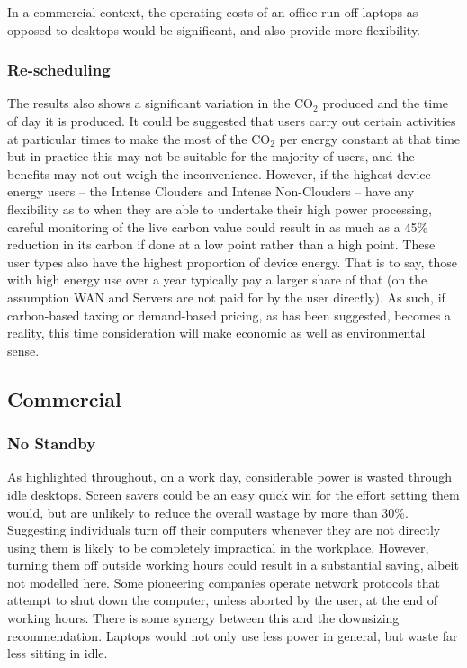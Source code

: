 \documentclass[conference]{IEEEtran}
\begin{document}

In a commercial context, the operating costs of an office run off
laptops as opposed to desktops would be significant, and also provide
more flexibility.

\subsubsection{Re-scheduling}

The results also shows a significant variation in the CO$_2$ produced
and the time of day it is produced. It could be suggested that users
carry out certain activities at particular times to make the most of
the CO$_2$ per energy constant at that time but in practice this may
not be suitable for the majority of users, and the benefits may not
out-weigh the inconvenience. However, if the highest device energy
users -- the Intense Clouders and Intense Non-Clouders -- have any
flexibility as to when they are able to undertake their high power
processing, careful monitoring of the live carbon value could result
in as much as a 45\% reduction in its carbon if done at a low point
rather than a high point. These user types also have the highest
proportion of device energy. That is to say, those with high energy
use over a year typically pay a larger share of that (on the
assumption WAN and Servers are not paid for by the user directly). As
such, if carbon-based taxing or demand-based pricing, as has been
suggested, becomes a reality, this time consideration will make
economic as well as environmental sense.

\subsection{Commercial}

\subsubsection{No Standby}

As highlighted throughout, on a work day, considerable power is wasted
through idle desktops. Screen savers could be an easy quick win for
the effort setting them would, but are unlikely to reduce the overall
wastage by more than 30\%. Suggesting individuals turn off their
computers whenever they are not directly using them is likely to be
completely impractical in the workplace. However, turning them off
outside working hours could result in a substantial saving, albeit not
modelled here. Some pioneering companies operate network protocols
that attempt to shut down the computer, unless aborted by the user, at
the end of working hours. There is some synergy between this and the
downsizing recommendation. Laptops would not only use less power in
general, but waste far less sitting in idle.
\end{document}
